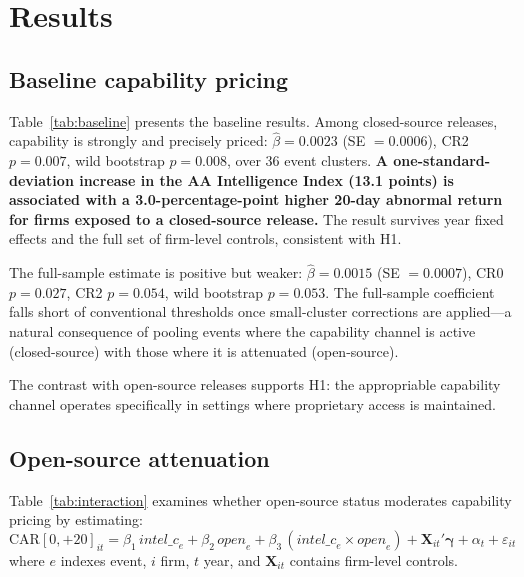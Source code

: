 \documentclass[12pt]{article}
\begin{document}
\section{Results}
\label{sec:results}

\subsection{Baseline capability pricing}

Table~\ref{tab:baseline} presents the baseline results. Among closed-source
releases, capability is strongly and precisely priced: $\hat{\beta} = 0.0023$
(SE $= 0.0006$), CR2 $p = 0.007$, wild bootstrap $p = 0.008$, over 36 event
clusters. \textbf{A one-standard-deviation increase in the AA Intelligence Index
(13.1 points) is associated with a 3.0-percentage-point higher 20-day abnormal
return for firms exposed to a closed-source release.} The result survives year
fixed effects and the full set of firm-level controls, consistent with H1.

The full-sample estimate is positive but weaker: $\hat{\beta} = 0.0015$
(SE $= 0.0007$), CR0 $p = 0.027$, CR2 $p = 0.054$, wild bootstrap $p = 0.053$.
The full-sample coefficient falls short of conventional thresholds once
small-cluster corrections are applied---a natural consequence of pooling events
where the capability channel is active (closed-source) with those where it is
attenuated (open-source).

The contrast with open-source releases supports H1: the appropriable capability
channel operates specifically in settings where proprietary access is maintained.

\subsection{Open-source attenuation}

Table~\ref{tab:interaction} examines whether open-source status moderates
capability pricing by estimating:
\begin{equation}
\label{eq:interaction}
\text{CAR}[0,{+}20]_{it} = \beta_1\,\textit{intel\_c}_{e}
  + \beta_2\,\textit{open}_{e}
  + \beta_3\,(\textit{intel\_c}_{e} \times \textit{open}_{e})
  + \mathbf{X}_{it}'\boldsymbol{\gamma}
  + \alpha_t + \varepsilon_{it}
\end{equation}
where $e$ indexes event, $i$ firm, $t$ year, and $\mathbf{X}_{it}$ contains
firm-level controls.
\end{document}
